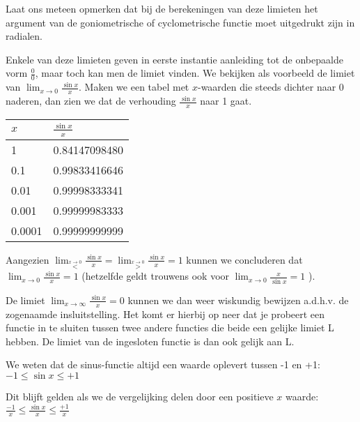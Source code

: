 Laat ons meteen opmerken dat bij de berekeningen van deze limieten
het argument van de goniometrische of cyclometrische functie moet
uitgedrukt zijn in radialen. 

\medskip{}


\noindent Enkele van deze limieten geven in eerste instantie aanleiding
tot de onbepaalde vorm $\frac{0}{0}$, maar toch kan men de limiet
vinden. We bekijken als voorbeeld de limiet van ${\displaystyle \lim_{x\to0}}\frac{\sin x}{x}$.
Maken we een tabel met $x$-waarden die steeds dichter naar $0$ naderen,
dan zien we dat de verhouding $\frac{\sin x}{x}$ naar 1 gaat.

\begin{table}[ht]
	\centering
	\begin{tabular}{|l|l|}
		\hline 
		$x$ & $\frac{\sin x}{x}$\\
		\hline 
		\hline 
		1 & 0.84147098480\\
		\hline 
		0.1 & 0.99833416646\\
		\hline 
		0.01 & 0.99998333341\\
		\hline 
		0.001 & 0.99999983333\\
		\hline 
		0.0001 & 0.99999999999\\
		\hline 
	\end{tabular}
\end{table}

\medskip{}


\noindent Aangezien ${\displaystyle \lim_{\overset{x\rightarrow0}{<}}}\frac{\sin x}{x}={\displaystyle \lim_{\overset{x\rightarrow0}{>}}}\frac{\sin x}{x}=1$
kunnen we concluderen dat ${\displaystyle \lim_{x\rightarrow0}}\frac{\sin x}{x}=1$
(hetzelfde geldt trouwens ook voor ${\displaystyle \lim_{x\rightarrow0}}\frac{x}{\sin x}=1$
).\medskip{}


\noindent De limiet ${\displaystyle \lim_{x\rightarrow\infty}}\frac{\sin x}{x}=0$
kunnen we dan weer wiskundig bewijzen a.d.h.v. de zogenaamde insluitstelling.
Het komt er hierbij op neer dat je probeert een functie in te sluiten
tussen twee andere functies die beide een gelijke limiet L hebben.
De limiet van de ingesloten functie is dan ook gelijk aan L.

\noindent \medskip{}


\noindent We weten dat de sinus-functie altijd een waarde oplevert
tussen -1 en +1: $-1\leq\sin x\leq+1$

\noindent Dit blijft gelden als we de vergelijking delen door een
positieve $x$ waarde: $\frac{-1}{x}\leq\frac{\sin x}{x}\leq\frac{+1}{x}$

